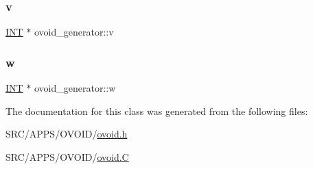 \mbox{\label{classovoid__generator_a5984121d09288b597194e3f68b4accfa}} 
\subsubsection{\texorpdfstring{v}{v}}
{\footnotesize\ttfamily \mbox{\hyperlink{galois_8h_a09fddde158a3a20bd2dcadb609de11dc}{I\+NT}} $\ast$ ovoid\+\_\+generator\+::v}

\mbox{\label{classovoid__generator_a007827a1175f7680e0571def121b0a3c}} 
\subsubsection{\texorpdfstring{w}{w}}
{\footnotesize\ttfamily \mbox{\hyperlink{galois_8h_a09fddde158a3a20bd2dcadb609de11dc}{I\+NT}} $\ast$ ovoid\+\_\+generator\+::w}



The documentation for this class was generated from the following files\+:\begin{DoxyCompactItemize}
\item 
S\+R\+C/\+A\+P\+P\+S/\+O\+V\+O\+I\+D/\mbox{\hyperlink{ovoid_8h}{ovoid.\+h}}\item 
S\+R\+C/\+A\+P\+P\+S/\+O\+V\+O\+I\+D/\mbox{\hyperlink{_o_v_o_i_d_2ovoid_8_c}{ovoid.\+C}}\end{DoxyCompactItemize}
